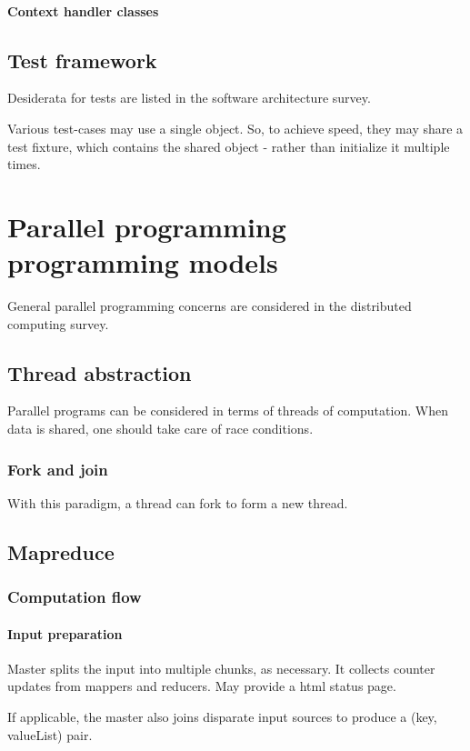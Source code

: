 \documentclass[oneside, article]{memoir}
\begin{document}
\subsubsection{Context handler classes}
\tbc

\section{Test framework}
Desiderata for tests are listed in the software architecture survey.

Various test-cases may use a single object. So, to achieve speed, they may share a test fixture, which contains the shared object - rather than initialize it multiple times.

\chapter{Parallel programming programming models}
General parallel programming concerns are considered in the distributed computing survey.

\section{Thread abstraction}
Parallel programs can be considered in terms of threads of computation. When data is shared, one should take care of race conditions.

\subsection{Fork and join}
With this paradigm, a thread can fork to form a new thread. \tbc

\section{Mapreduce}
\subsection{Computation flow}
\subsubsection{Input preparation}
Master splits the input into multiple chunks, as necessary. It collects counter updates from mappers and reducers. May provide a html status page.

If applicable, the master also joins disparate input sources to produce a (key, valueList) pair.
\end{document}
